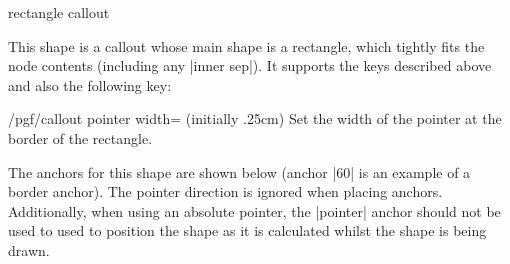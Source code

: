   
\begin{shape}{rectangle callout}%
	
  This shape is a callout whose main shape is a rectangle, which 
  tightly fits the node contents (including any |inner sep|).
  It  supports the keys described above and also the following 
  key:
  
  
\begin{key}{/pgf/callout pointer width= (initially .25cm)} 
  Set the width of the pointer at the border of the rectangle.
\end{key}
		
	The anchors for this shape are shown below (anchor |60| is an
	example of a border anchor). The pointer direction is ignored when 
	placing anchors. 
	Additionally, when using an absolute pointer, the |pointer| 
	anchor should not be used to used to position the shape as it is 
	calculated whilst the shape is being drawn.
	
\begin{codeexample}[]
\Huge
{}
\end{codeexample}

\end{shape}%


